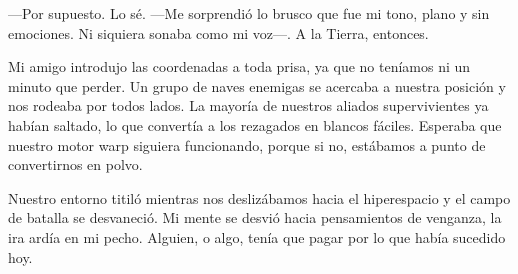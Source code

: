 —Por supuesto. Lo sé. —Me sorprendió lo brusco que fue mi tono, plano y sin emociones. Ni siquiera sonaba como mi voz—. A la Tierra, entonces.

Mi amigo introdujo las coordenadas a toda prisa, ya que no teníamos ni un minuto que perder. Un grupo de naves enemigas se acercaba a nuestra posición y nos rodeaba por todos lados. La mayoría de nuestros aliados supervivientes ya habían saltado, lo que convertía a los rezagados en blancos fáciles. Esperaba que nuestro motor warp siguiera funcionando, porque si no, estábamos a punto de convertirnos en polvo.

Nuestro entorno titiló mientras nos deslizábamos hacia el hiperespacio y el campo de batalla se desvaneció. Mi mente se desvió hacia pensamientos de venganza, la ira ardía en mi pecho. Alguien, o algo, tenía que pagar por lo que había sucedido hoy.